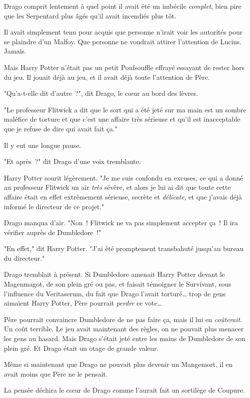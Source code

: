 Drago comprit lentement à quel point il avait été un imbécile \emph{complet}, bien pire que les Serpentard plus âgés qu'il avait incendiés plus tôt.

Il avait simplement tenu pour acquis que personne n'irait voir les autorités pour se plaindre d'un Malfoy. Que personne ne voudrait attirer l'attention de Lucius. Jamais.

Mais Harry Potter n'était pas un petit Poufsouffle effrayé essayant de rester hors du jeu. Il jouait déjà au jeu, et il avait déjà toute l'attention de Père.

"Qu'a-t-elle dit d'autre~?", dit Drago, le cœur au bord des lèvres.

"Le professeur Flitwick a dit que le sort qui a été jeté sur ma main est un sombre maléfice de torture et que c'est une affaire très sérieuse et qu'il est inacceptable que je refuse de dire qui avait fait ça."

Il y eut une longue pause.

"Et après~?" dit Drago d'une voix tremblante.

Harry Potter sourit légèrement. "Je me suis confondu en excuses, ce qui a donné au professeur Flitwick un air \emph{très} sévère, et alors je lui ai dit que toute cette affaire était en effet extrêmement sérieuse, secrète et \emph{délicate}, et que j'avais déjà informé le directeur de ce projet."

Drago manqua d'air. "Non~! Flitwick ne va pas simplement accepter ça~! Il ira vérifier auprès de Dumbledore~!"

"En effet," dit Harry Potter. "J'ai été promptement transbahuté jusqu'au bureau du directeur."

Drago tremblait à présent. Si Dumbledore amenait Harry Potter devant le Magenmagot, de son plein gré ou pas, et faisait témoigner le Survivant, sous l'influence du Veritaserum, du fait que Drago l'avait torturé… trop de gens aimaient Harry Potter, Père pourrait \emph{perdre} ce vote…

Père pourrait convaincre Dumbledore de ne pas faire ça, mais il lui en \emph{coûterait}. Un coût terrible. Le jeu avait maintenant des règles, on ne pouvait plus menacer les gens au hasard. Mais Drago s'était jeté entre les mains de Dumbledore de son plein gré. Et Drago était un otage de grande valeur.

Même si maintenant que Drago ne pouvait plus devenir un Mangemort, il en avait moins que Père ne le pensait.

La pensée déchira le cœur de Drago comme l'aurait fait un sortilège de Coupure.

